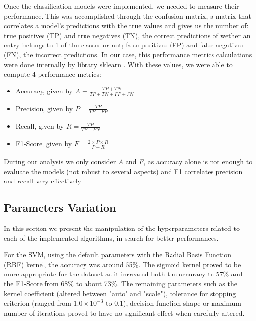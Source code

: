 \documentclass[extendedabs]{recpad2k}
\begin{document}
Once the classification models were implemented, we needed to measure their performance.
This was accomplished through the confusion matrix, a matrix that correlates a model's predictions with the true values and gives us the number of: 
true positives (TP) and true negatives (TN), the correct predictions of wether an entry belongs to 1 of the classes or not; false positives (FP) and 
false negatives (FN), the incorrect predictions.
In our case, this performance metrics calculations were done internally by library sklearn \cite{sklearn}.
With these values, we were able to compute 4 performance metrics:
\begin{itemize}[noitemsep,nolistsep]
\item Accuracy, given by $A = \frac{TP + TN}{TP + TN + FP + FN}$
\vspace{3pt}
\item Precision, given by $P = \frac{TP}{TP + FP}$
\vspace{3pt}
\item Recall, given by $R = \frac{TP}{TP + FN}$
\vspace{3pt}
\item F1-Score, given by $F = \frac{2 \times P \times R}{P + R}$
\vspace{3pt}
\end{itemize}
During our analysis we only consider \textit{A} and \textit{F}, as accuracy alone is not enough to evaluate the models (not robust to several aspects) and F1 
correlates precision and recall very effectively.

\subsection{Parameters Variation}

In this section we present the manipulation of the hyperparameters related to each of the implemented algorithms, in search for better performances.

For the SVM, using the default parameters with the Radial Basis Function (RBF) kernel, the accuracy was around 55\%.
The sigmoid kernel proved to be more appropriate for the dataset as it increased both the accuracy to 57\% and the F1-Score from 68\% to about 73\%.
The remaining parameters such as the kernel coefficient (altered between "auto" and "scale"), tolerance for stopping criterion (ranged from $1.0 \times 10^{-3}$
to $0.1$), decision function shape or maximum number of iterations proved to have no significant effect when carefully altered.
\end{document}
